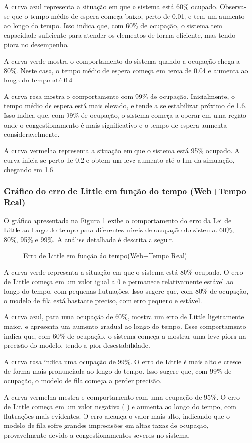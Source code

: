 A curva azul representa a situação em que o sistema está 60\% ocupado. Observa-se que o tempo médio de espera começa baixo, perto de 0.01, e tem um aumento ao longo do tempo. Isso indica que, com 60\% de ocupação, o sistema tem capacidade suficiente para atender os elementos de forma eficiente, mas tendo piora no desempenho.

A curva verde mostra o comportamento do sistema quando a ocupação chega a 80\%. Neste caso, o tempo médio de espera começa em cerca de 0.04 e aumenta ao longo do tempo até 0.4.

A curva rosa mostra o comportamento com 99\% de ocupação. Inicialmente, o tempo médio de espera está mais elevado, e tende a se estabilizar próximo de 1.6. Isso indica que, com 99\% de ocupação, o sistema começa a operar em uma região onde o congestionamento é mais significativo e o tempo de espera aumenta consideravelmente.

A curva vermelha representa a situação em que o sistema está 95\% ocupado. A curva inicia-se perto de 0.2 e obtem um leve aumento até o fim da simulação, chegando em 1.6


\subsubsection{Gráfico do erro de Little em função do tempo (Web+Tempo Real)}
O gráfico apresentado na Figura \ref{fig:littleE2Web} exibe o comportamento do erro da Lei de Little ao longo do tempo para diferentes níveis de ocupação do sistema: 60\%, 80\%, 95\% e 99\%. A análise detalhada é descrita a seguir.

\begin{figure}[h!]
   \centering
   
   \caption{Erro de Little em função do tempo(Web+Tempo Real)}
   \label{fig:littleE2Web}
\end{figure}

A curva verde representa a situação em que o sistema está 80\% ocupado. O erro de Little começa em um valor igual a 0 e permanece relativamente estável ao longo do tempo, com pequenas flutuações. Isso sugere que, com 80\% de ocupação, o modelo de fila está bastante preciso, com erro pequeno e estável.

A curva azul, para uma ocupação de 60\%, mostra um erro de Little ligeiramente maior, e apresenta um aumento gradual ao longo do tempo. Esse comportamento indica que, com 60\% de ocupação, o sistema começa a mostrar uma leve piora na precisão do modelo, tendo a pior desestabilidade.

A curva rosa indica uma ocupação de 99\%. O erro de Little é mais alto e cresce de forma mais pronunciada ao longo do tempo. Isso sugere que, com 99\% de ocupação, o modelo de fila começa a perder precisão.

A curva vermelha mostra o comportamento com uma ocupação de 95\%. O erro de Little começa em um valor negativo (
 ) e aumenta ao longo do tempo, com flutuações mais evidentes. O erro alcança o valor mais alto, indicando que o modelo de fila sofre grandes imprecisões em altas taxas de ocupação, provavelmente devido a congestionamentos severos no sistema.